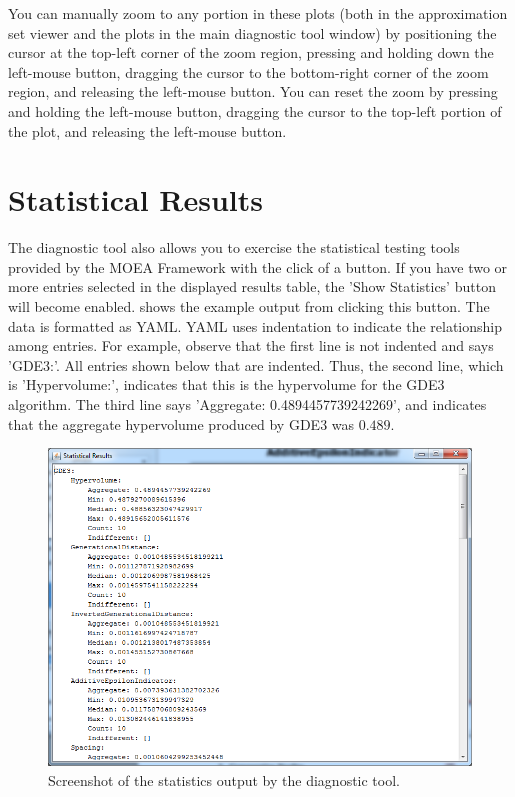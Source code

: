 \begin{tip}
  You can manually zoom to any portion in these plots (both in the approximation set viewer and the plots in the main diagnostic tool window) by positioning the cursor at the top-left corner of the zoom region, pressing and holding down the left-mouse button, dragging the cursor to the bottom-right corner of the zoom region, and releasing the left-mouse button.  You can reset the zoom by pressing and holding the left-mouse button, dragging the cursor to the top-left portion of the plot, and releasing the left-mouse button.
\end{tip}

\section{Statistical Results}
The diagnostic tool also allows you to exercise the statistical testing tools provided by the MOEA Framework with the click of a button.  If you have two or more entries selected in the displayed results table, the 'Show Statistics' button will become enabled.   shows the example output from clicking this button.  The data is formatted as YAML.  YAML uses indentation to indicate the relationship among entries.  For example, observe that the first line is not indented and says 'GDE3:'.  All entries shown below that are indented.  Thus, the second line, which is 'Hypervolume:', indicates that this is the hypervolume for the GDE3 algorithm.  The third line says 'Aggregate: 0.4894457739242269', and indicates that the aggregate hypervolume produced by GDE3 was $0.489$.

\begin{figure}
  \includegraphics[width=\linewidth]{statisticalResultsViewer.png}
  \caption{Screenshot of the statistics output by the diagnostic tool.}
  \label{fig:statisticalResultsViewer}
\end{figure}

